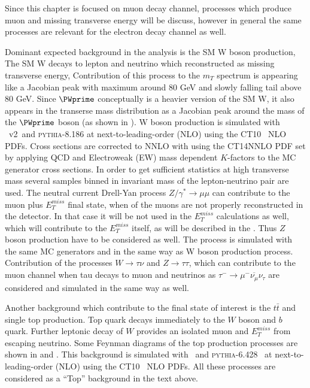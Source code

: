
Since this chapter is focused on muon decay channel, processes which produce muon and
missing transverse energy will be discuss, however in general the same processes are 
relevant for the electron decay channel as well.

Dominant expected background in the analysis is the SM W boson production,
The SM W decays to lepton and neutrino which reconstructed as missing transverse energy,
Contribution of this process to the $m_T$ spectrum is appearing like a Jacobian peak 
with maximum around 80 GeV and slowly falling tail above 80 GeV.
Since $\PWprime$ conceptually is a heavier version of the SM W, it also appears in the 
transerse mass distribution as a Jacobian peak around the mass of the $\PWprime$ boson
(as shown in ). 
W boson production is simulated with \powhegbox\ v2~\cite{Alioli:2010xd}and {\scshape pythia-8.186} at next-to-leading-order (NLO) using the CT10~\cite{CT10} NLO PDFs. 
Cross sections are corrected to NNLO with using the CT14NNLO PDF set by applying QCD and Electroweak (EW) mass dependent $K$-factors to the MC generator cross sections.
In order to get sufficient statistics at high transverse mass several samples binned in invariant mass of the lepton-neutrino pair are used.
The neutral current Drell-Yan process $Z/\gamma^* \to \mu \mu$ can contribute to the muon plus $E_T^{miss}$ final state, when of the muons are not properly reconstructed 
in the detector. In that case it will be not used in the $E_T^{miss}$ calculations as well, which will contribute to the $E_T^{miss}$ itself, as will be described in the .
Thus $Z$ boson production have to be considered as well. The process is simulated with the same MC generators and in the same way as W boson production process.
Contribution of the processes $W \to \tau \nu$ and $Z \to \tau \tau$, which can contribute to the muon channel 
when tau decays to muon and neutrinos as $\tau^{-} \to \mu^{-} \overline{\nu_{\mu}} \nu_{\tau} $ are considered and simulated in the same way as well.

Another background which contribute to the final state of interest is the $t\bar{t}$ and single top production.
Top quark decays immediately to the $W$ boson and $b$ quark. Further leptonic decay of $W$ provides an isolated muon and $E_T^{miss}$ from escaping neutrino.
Some Feynman diagrams of the top production processes are shown in  and .
This background is simulated with \powhegbox\ and {\scshape pythia-6.428}~\cite{Pythia} at next-to-leading-order (NLO) using the CT10~\cite{CT10} NLO PDFs.
All these processes are considered as a ``Top'' background in the text above.

